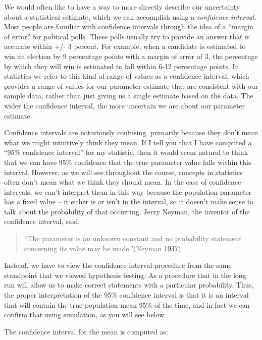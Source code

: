 \documentclass[12pt,]{book}
\theoremstyle{definition}
\theoremstyle{definition}
\theoremstyle{definition}
\theoremstyle{remark}
\begin{document}
We would often like to have a way to more directly describe our uncertainty about a statistical estimate, which we can accomplish using a \emph{confidence interval}. Most people are familiar with confidence intervals through the idea of a ``margin of error'' for political polls. These polls usually try to provide an answer that is accurate within +/- 3 percent. For example, when a candidate is estimated to win an election by 9 percentage points with a margin of error of 3, the percentage by which they will win is estimated to fall within 6-12 percentage points. In statistics we refer to this kind of range of values as a confidence interval, which provides a range of values for our parameter estimate that are consistent with our sample data, rather than just giving us a single estimate based on the data. The wider the confidence interval, the more uncertain we are about our parameter estimate.

Confidence intervals are notoriously confusing, primarily because they don't mean what we might intuitively think they mean. If I tell you that I have computed a ``95\% confidence interval'' for my statistic, then it would seem natural to think that we can have 95\% confidence that the true parameter value falls within this interval. However, as we will see throughout the course, concepts in statistics often don't mean what we think they should mean. In the case of confidence intervals, we can't interpret them in this way because the population parameter has a fixed value -- it either is or isn't in the interval, so it doesn't make sense to talk about the probability of that occurring. Jerzy Neyman, the inventor of the confidence interval, said:

\begin{quote}
``The parameter is an unknown constant and no probability statement concerning its value may be made.''(Neyman \protect\hyperlink{ref-Neyman37}{1937})
\end{quote}

Instead, we have to view the confidence interval procedure from the same standpoint that we viewed hypothesis testing: As a procedure that in the long run will allow us to make correct statements with a particular probability. Thus, the proper interpretation of the 95\% confidence interval is that it is an interval that will contain the true population mean 95\% of the time, and in fact we can confirm that using simulation, as you will see below.

The confidence interval for the mean is computed as:
\end{document}
